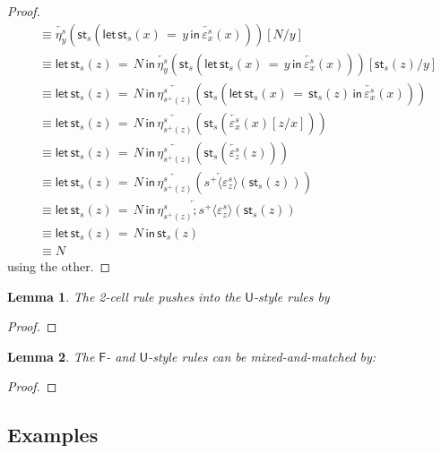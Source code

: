 \documentclass[10pt]{article}
\newtheorem{lemma}{Lemma}
\theoremstyle{definition}
\newcommand{\rewrite}[2]{\overleftarrow{#1}(#2)}
\newcommand\StI[2]{\ensuremath{\mathsf{st}_{#1}(#2)}}
\newcommand\UStI[2]{\ensuremath{\mathsf{ust}_{#1}(#2)}}
\newcommand\UnSt[2]{\ensuremath{\mathsf{unst}_{#1}(#2)}}
\newcommand\StE[4]{\ensuremath{\mathsf{let} \, \StI{#1}{#3} \, = \, {#2} \, \mathsf{in} \, #4}}
\newcommand\TrPlus[2]{\ensuremath{{#1}^+(#2)}}
\newcommand\ap[2]{\ensuremath{#1 \langle #2 \rangle }}
\begin{document}
\begin{proof}
\begin{align*}
&\equiv \rewrite{\eta^s_y}{\StI{s}{\StE{s}{y}{x}{\rewrite{\varepsilon^s_x}{x}}}}[N/y] \\ 
&\equiv \StE{s}{N}{z}{\rewrite{\eta^s_y}{\StI{s}{\StE{s}{y}{x}{\rewrite{\varepsilon^s_x}{x}}}}[\StI{s}{z}/y]} \\ 
&\equiv \StE{s}{N}{z}{\rewrite{\eta^s_{\TrPlus{s}{z}}}{\StI{s}{\StE{s}{\StI{s}{z}}{x}{\rewrite{\varepsilon^s_x}{x}}}}} \\ 
&\equiv \StE{s}{N}{z}{\rewrite{\eta^s_{\TrPlus{s}{z}}}{\StI{s}{\rewrite{\varepsilon^s_x}{x}[z/x]}}} \\ 
&\equiv \StE{s}{N}{z}{\rewrite{\eta^s_{\TrPlus{s}{z}}}{\StI{s}{\rewrite{\varepsilon^s_z}{z}}}} \\ 
&\equiv \StE{s}{N}{z}{\rewrite{\eta^s_{\TrPlus{s}{z}}}{\rewrite{\ap{s^+}{\varepsilon^s_z}}{\StI{s}{z}}}} \\ 
&\equiv \StE{s}{N}{z}{\rewrite{\eta^s_{\TrPlus{s}{z}};\ap{s^+}{\varepsilon^s_z}}{\StI{s}{z}}} \\ 
&\equiv \StE{s}{N}{z}{\StI{s}{z}} \\ 
&\equiv N
\end{align*}
using the other.
\end{proof}

\begin{lemma}
The 2-cell rule pushes into the $\mathsf{U}$-style rules by
\end{lemma}
\begin{proof}
\end{proof}

\begin{lemma}
The $\mathsf{F}$- and $\mathsf{U}$-style rules can be mixed-and-matched by:
\end{lemma}
\begin{proof}
\end{proof}


\subsection{Examples}
\end{document}
